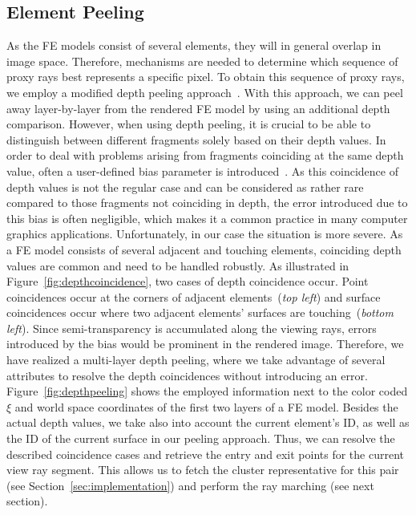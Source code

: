 \documentclass[journal]{vgtc}                %
\begin{document}
\subsection{Element Peeling}\label{subsec:peeling}
As the FE models consist of several elements, they will in general overlap in image space. Therefore, mechanisms are needed to determine which sequence of proxy rays best represents a specific pixel. To obtain this sequence of proxy rays, we employ a modified depth peeling approach~\cite{mammen89DepthPeeling}. With this approach, we can peel away layer-by-layer from the rendered FE model by using an additional depth comparison. However, when using depth peeling, it is crucial to be able to distinguish between different fragments solely based on their depth values. In order to deal with problems arising from fragments coinciding at the same depth value, often a user-defined bias parameter is introduced~\cite{Everitt01interactiveorder-independent}. As this coincidence of depth values is not the regular case and can be considered as rather rare compared to those fragments not coinciding in depth, the error introduced due to this bias is often negligible, which makes it a common practice in many computer graphics applications. Unfortunately, in our case the situation is more severe. As a FE model consists of several adjacent and touching elements, coinciding depth values are common and need to be handled robustly. As illustrated in Figure~\ref{fig:depthcoincidence}, two cases of depth coincidence occur. Point coincidences occur at the corners of adjacent elements~({\it top left}) and surface coincidences occur where two adjacent elements' surfaces are touching~({\it bottom left}). Since semi-transparency is accumulated along the viewing rays, errors introduced by the bias would be prominent in the rendered image. Therefore, we have realized a multi-layer depth peeling, where we take advantage of several attributes to resolve the depth coincidences without introducing an error. Figure~\ref{fig:depthpeeling} shows the employed information next to the color coded $\xi$ and world space coordinates of the first two layers of a FE model. Besides the actual depth values, we take also into account the current element's ID, as well as the ID of the current surface in our peeling approach. Thus, we can resolve the described coincidence cases and retrieve the entry and exit points for the current view ray segment. This allows us to fetch the cluster representative for this pair (see Section~\ref{sec:implementation}) and perform the ray marching (see next section).
%
%
%
\end{document}
